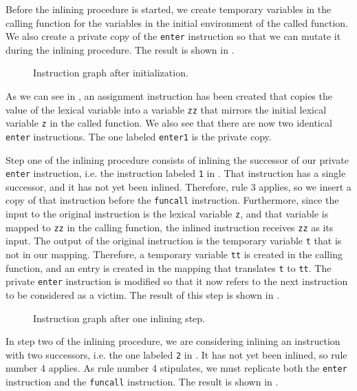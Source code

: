 Before the inlining procedure is started, we create temporary
variables in the calling function for the variables in the initial
environment of the called function.  We also create a private copy of
the \texttt{enter} instruction so that we can mutate it during the
inlining procedure.  The result is shown in .

\begin{figure}
\begin{center}
\end{center}
\caption{\label{fig42}
Instruction graph after initialization.}
\end{figure}

As we can see in , an assignment instruction has been
created that copies the value of the lexical variable into a variable
\texttt{zz} that mirrors the initial lexical variable \texttt{z} in
the called function.  We also see that there are now two identical
\texttt{enter} instructions.  The one labeled \texttt{enter1} is the
private copy.

Step one of the inlining procedure consists of inlining the successor
of our private \texttt{enter} instruction, i.e. the instruction
labeled \texttt{1} in .  That instruction has a single
successor, and it has not yet been inlined.  Therefore, rule 3
applies, so we insert a copy of that instruction before the
\texttt{funcall} instruction.  Furthermore, since the input to the
original instruction is the lexical variable \texttt{z}, and that
variable is mapped to \texttt{zz} in the calling function, the inlined
instruction receives \texttt{zz} as its input.  The output of the
original instruction is the temporary variable \texttt{t} that is not
in our mapping.  Therefore, a temporary variable \texttt{tt} is
created in the calling function, and an entry is created in the
mapping that translates \texttt{t} to \texttt{tt}.  The private
\texttt{enter} instruction is modified so that it now refers to the
next instruction to be considered as a victim.  The result of this
step is shown in .

\begin{figure}
\begin{center}
\end{center}
\caption{\label{fig43}
Instruction graph after one inlining step.}
\end{figure}

In step two of the inlining procedure, we are considering inlining an
instruction with two successors, i.e. the one labeled \texttt{2} in
.  It has not yet been inlined, so rule number 4
applies.  As rule number 4 stipulates, we must replicate both the
\texttt{enter} instruction and the \texttt{funcall} instruction.  The
result is shown in .

